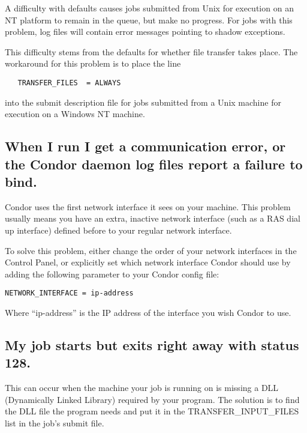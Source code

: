 A difficulty with defaults causes jobs submitted from Unix for execution
on an NT platform to remain in the queue, but make no progress.
For jobs with this problem, log files will contain error messages
pointing to shadow exceptions.

This difficulty stems from the defaults for whether file transfer
takes place.
The workaround for this problem is to place the line
\begin{verbatim}
   TRANSFER_FILES  = ALWAYS
\end{verbatim}
into the submit description file for jobs submitted from a Unix
machine for execution on a Windows NT machine.


\subsection*{When I run  I get a communication error, or the Condor daemon log files report a failure to bind.}

Condor uses the first network interface it sees on your machine.
This problem usually means you have an extra, inactive network
interface (such as a RAS dial up interface) defined before to your
regular network interface.

To solve this problem, either change the order of your network
interfaces in the Control Panel, or explicitly set which network
interface Condor should use by adding the following parameter to your
Condor config file:

\begin{verbatim}NETWORK_INTERFACE = ip-address\end{verbatim}

Where ``ip-address'' is the IP address of the interface you wish
Condor to use.

\subsection*{My job starts but exits right away with status 128.}

This can occur when the machine your job is running on is missing a
DLL (Dynamically Linked Library) required by your program.
The solution is to find the DLL file the program needs and put it in
the TRANSFER\_INPUT\_FILES list in the job's submit file.

